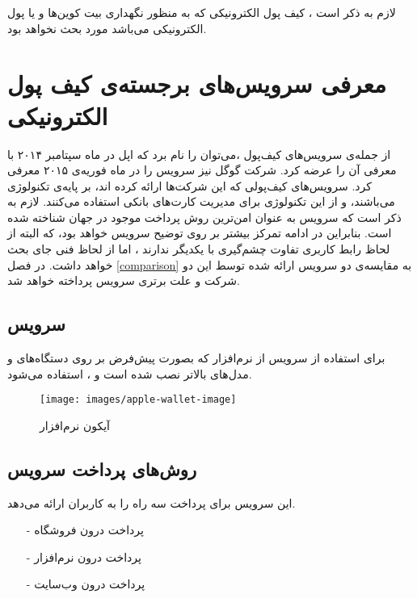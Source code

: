 \documentclass[oneside]{report}
\begin{document}
			  لازم به ذکر است ، کیف پول الکترونیکی که به منظور نگهداری بیت کوین‌ها
			  و یا پول الکترونیکی می‌باشد مورد بحث نخواهد بود.
			  
				\section{معرفی سرویس‌های برجسته‌ی کیف پول الکترونیکی }
		
		از جمله‌ی سرویس‌های کیف‌پول ،می‌توان 
				{\normalsize {}} 
		را نام برد که اپل در ماه سپتامبر ۲۰۱۴ با معرفی 
				{\normalsize {}} 
		آن را عرضه کرد.	شرکت گوگل نیز سرویس 
						{\normalsize {}} 
		را در ماه فوریه‌ی ۲۰۱۵ معرفی کرد. سرویس‌های کیف‌پولی که این شرکت‌ها ارائه کرده اند، بر پایه‌ی تکنولوژی 
			{\normalsize {}}
			می‌باشند، و از این تکنولوژی برای مدیریت کارت‌های بانکی استفاده می‌کنند. لازم به ذکر است که سرویس 
						{\normalsize {}} 
						به عنوان امن‌ترین روش پرداخت موجود در جهان شناخته شده است. 
						\cite{mostsecureBellID}
						بنابراین در ادامه تمرکز بیشتر بر روی توضیح سرویس
							 									 {\normalsize {}}
							 									 خواهد بود، که البته از لحاظ رابط کاربری تفاوت چشم‌گیری با یکدیگر ندارند ، اما از لحاظ فنی جای بحث خواهد داشت.
			در فصل \ref{comparison} به مقایسه‌ی دو سرویس ارائه شده توسط این دو شرکت  و علت برتری سرویس
										{\normalsize {}} 
			پرداخته خواهد شد.
		
		\subsection{ سرویس {\normalsize{}}}
		برای استفاده از سرویس 
								{\normalsize {}} 
								از نرم‌افزار
														{\normalsize {}} 
		که بصورت پیش‌فرض بر روی دستگاه‌های
								{\normalsize {}} 
								و مدل‌های بالاتر نصب شده است و 
																{\normalsize {}} 
							،	 استفاده می‌شود. 
		\begin{figure}[h]
			\centering
			\texttt{[image: images/apple-wallet-image]}
			\caption{آیکون نرم‌افزار {\footnotesize {}} }
			\label{wallet-image}
		\end{figure}
	\subsection{روش‌های پرداخت سرویس {\normalsize {}} }
	این سرویس برای پرداخت سه راه را به کاربران ارائه می‌دهد.
	\begin{itemize}
		\item[-] پرداخت درون فروشگاه 
		‌\item[-] پرداخت درون نرم‌افزار
		\item[-]پرداخت درون وب‌سایت
	\end{itemize}
\end{document}
